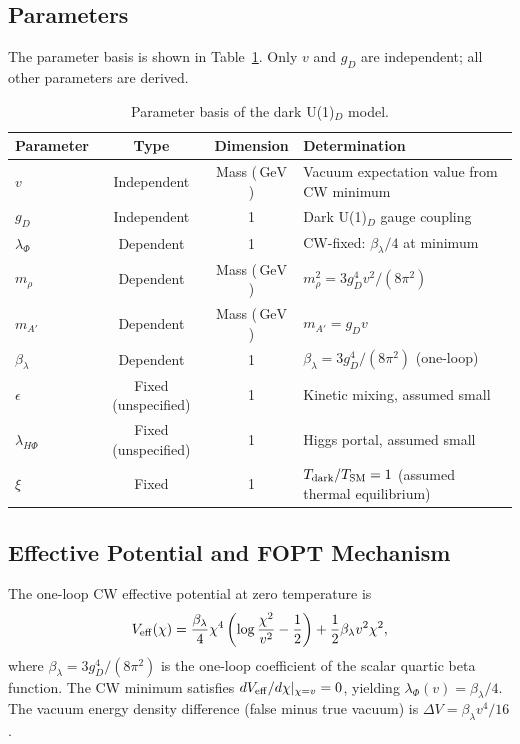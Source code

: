 \documentclass[a4paper,11pt]{article}
\newcommand{\GeV}{\,\text{GeV}}
\begin{document}
\subsection{Parameters}

The parameter basis is shown in Table~\ref{tab:parameters}. Only $v$ and $g_D$ are independent; all other parameters are derived.

\begin{table}[htbp]
\centering
\caption{Parameter basis of the dark U(1)$_D$ model.}
\label{tab:parameters}
\begin{tabularx}{\textwidth}{lccX}
\toprule
Parameter & Type & Dimension & Determination \\
\midrule
$v$ & Independent & Mass ($\GeV$) & Vacuum expectation value from CW minimum \\
$g_D$ & Independent & 1 & Dark U(1)$_D$ gauge coupling \\
$\lambda_\Phi$ & Dependent & 1 & CW-fixed: $\beta_\lambda/4$ at minimum \\
$m_\rho$ & Dependent & Mass ($\GeV$) & $m_\rho^2 = 3 g_D^4 v^2 / (8\pi^2)$ \\
$m_{A'}$ & Dependent & Mass ($\GeV$) & $m_{A'} = g_D v$ \\
$\beta_\lambda$ & Dependent & 1 & $\beta_\lambda = 3 g_D^4/(8\pi^2)$ (one-loop) \\
$\epsilon$ & Fixed (unspecified) & 1 & Kinetic mixing, assumed small \\
$\lambda_{H\Phi}$ & Fixed (unspecified) & 1 & Higgs portal, assumed small \\
$\xi$ & Fixed & 1 & $T_{\rm dark}/T_{\rm SM} = 1$ (assumed thermal equilibrium) \\
\bottomrule
\end{tabularx}
\end{table}

\subsection{Effective Potential and FOPT Mechanism}

The one-loop CW effective potential at zero temperature is
\begin{equation}
V_{\rm eff}(\chi) = \frac{\beta_\lambda}{4} \chi^4 \left( \log\frac{\chi^2}{v^2} - \frac12 \right) + \frac12 \beta_\lambda v^2 \chi^2,
\end{equation}
where $\beta_\lambda = 3 g_D^4/(8\pi^2)$ is the one-loop coefficient of the scalar quartic beta function. The CW minimum satisfies $dV_{\rm eff}/d\chi|_{\chi=v} = 0$, yielding $\lambda_\Phi(v) = \beta_\lambda/4$. The vacuum energy density difference (false minus true vacuum) is $\Delta V = \beta_\lambda v^4 / 16$.
\end{document}
